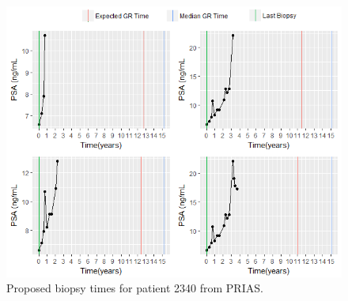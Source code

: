 \begin{figure}[!htb]
\centering
\captionsetup{justification=centering}
\includegraphics[width=\textwidth]{images/prias_demo/case_2340.png}
\caption{\label{fig : prias_demo_pid_2340} Proposed biopsy times for patient 2340 from PRIAS.}
\end{figure}